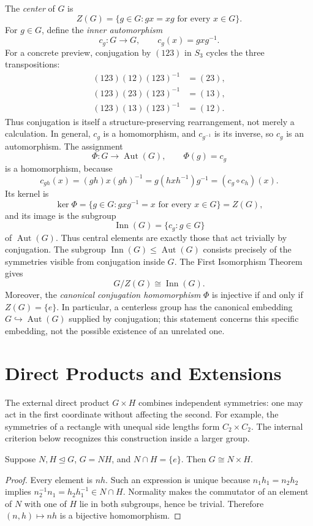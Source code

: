 The \emph{center} of \(G\) is
\[
Z(G)=\{g\in G:gx=xg\text{ for every }x\in G\}.
\]
For \(g\in G\), define the \emph{inner automorphism}
\[
c_g:G\to G,\qquad c_g(x)=gxg^{-1}.
\]
For a concrete preview, conjugation by \((123)\) in \(S_3\) cycles the three
transpositions:
\begin{align*}
(123)(12)(123)^{-1}&=(23),\\
(123)(23)(123)^{-1}&=(13),\\
(123)(13)(123)^{-1}&=(12).
\end{align*}
Thus conjugation is itself a structure-preserving rearrangement, not merely a
calculation. In general, \(c_g\) is a homomorphism, and \(c_{g^{-1}}\) is
its inverse, so \(c_g\) is an automorphism. The assignment
\[
\Phi:G\longrightarrow\operatorname{Aut}(G),\qquad \Phi(g)=c_g
\]
is a homomorphism, because
\[
c_{gh}(x)=(gh)x(gh)^{-1}=g(hxh^{-1})g^{-1}
=(c_g\circ c_h)(x).
\]
Its kernel is
\[
\ker\Phi=\{g\in G:gxg^{-1}=x\text{ for every }x\in G\}=Z(G),
\]
and its image is the subgroup
\[
\operatorname{Inn}(G)=\{c_g:g\in G\}
\]
of \(\operatorname{Aut}(G)\). Thus central elements are exactly those that
act trivially by conjugation. The subgroup
\(\operatorname{Inn}(G)\leq\operatorname{Aut}(G)\) consists precisely of
the symmetries visible from conjugation inside \(G\). The First Isomorphism Theorem gives
\[
G/Z(G)\cong\operatorname{Inn}(G).
\]
Moreover, the \emph{canonical conjugation homomorphism} \(\Phi\) is injective
if and only if \(Z(G)=\{e\}\). In particular, a centerless group has the
canonical embedding \(G\hookrightarrow\operatorname{Aut}(G)\) supplied by
conjugation; this statement
concerns this specific embedding, not the possible existence of an unrelated
one.

\section{Direct Products and Extensions}

The external direct product \(G\times H\) combines independent symmetries:
one may act in the first coordinate without affecting the second.  For example,
the symmetries of a rectangle with unequal side lengths form \(C_2\times C_2\).
The internal criterion below recognizes this construction inside a larger group.

\begin{proposition}
Suppose \(N,H\trianglelefteq G\), \(G=NH\), and \(N\cap H=\{e\}\).  Then
\(G\cong N\times H\).
\end{proposition}
\begin{proof}
Every element is \(nh\).  Such an expression is unique because
\(n_1h_1=n_2h_2\) implies \(n_2^{-1}n_1=h_2h_1^{-1}\in N\cap H\).
Normality makes the commutator of an element of \(N\) with one of \(H\) lie in
both subgroups, hence be trivial.  Therefore \((n,h)\mapsto nh\) is a
bijective homomorphism.
\end{proof}

